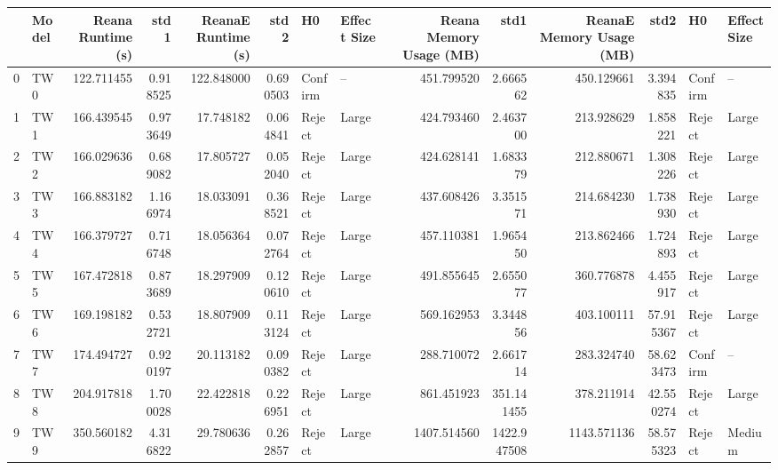 \begin{tabular}{llrrrrllrrrrll}
\toprule
{} & Model &  Reana Runtime (s) &      std1 &  ReanaE Runtime (s) &      std2 &       H0 & Effect Size &  Reana Memory Usage (MB) &         std1 &  ReanaE Memory Usage (MB) &       std2 &       H0 & Effect Size \\
\midrule
0 &  TW 0 &         122.711455 &  0.918525 &          122.848000 &  0.690503 &  Confirm &          -- &               451.799520 &     2.666562 &                450.129661 &   3.394835 &  Confirm &          -- \\
1 &  TW 1 &         166.439545 &  0.973649 &           17.748182 &  0.064841 &   Reject &       Large &               424.793460 &     2.463700 &                213.928629 &   1.858221 &   Reject &       Large \\
2 &  TW 2 &         166.029636 &  0.689082 &           17.805727 &  0.052040 &   Reject &       Large &               424.628141 &     1.683379 &                212.880671 &   1.308226 &   Reject &       Large \\
3 &  TW 3 &         166.883182 &  1.166974 &           18.033091 &  0.368521 &   Reject &       Large &               437.608426 &     3.351571 &                214.684230 &   1.738930 &   Reject &       Large \\
4 &  TW 4 &         166.379727 &  0.716748 &           18.056364 &  0.072764 &   Reject &       Large &               457.110381 &     1.965450 &                213.862466 &   1.724893 &   Reject &       Large \\
5 &  TW 5 &         167.472818 &  0.873689 &           18.297909 &  0.120610 &   Reject &       Large &               491.855645 &     2.655077 &                360.776878 &   4.455917 &   Reject &       Large \\
6 &  TW 6 &         169.198182 &  0.532721 &           18.807909 &  0.113124 &   Reject &       Large &               569.162953 &     3.344856 &                403.100111 &  57.915367 &   Reject &       Large \\
7 &  TW 7 &         174.494727 &  0.920197 &           20.113182 &  0.090382 &   Reject &       Large &               288.710072 &     2.661714 &                283.324740 &  58.623473 &  Confirm &          -- \\
8 &  TW 8 &         204.917818 &  1.700028 &           22.422818 &  0.226951 &   Reject &       Large &               861.451923 &   351.141455 &                378.211914 &  42.550274 &   Reject &       Large \\
9 &  TW 9 &         350.560182 &  4.316822 &           29.780636 &  0.262857 &   Reject &       Large &              1407.514560 &  1422.947508 &               1143.571136 &  58.575323 &   Reject &      Medium \\
\bottomrule
\end{tabular}
